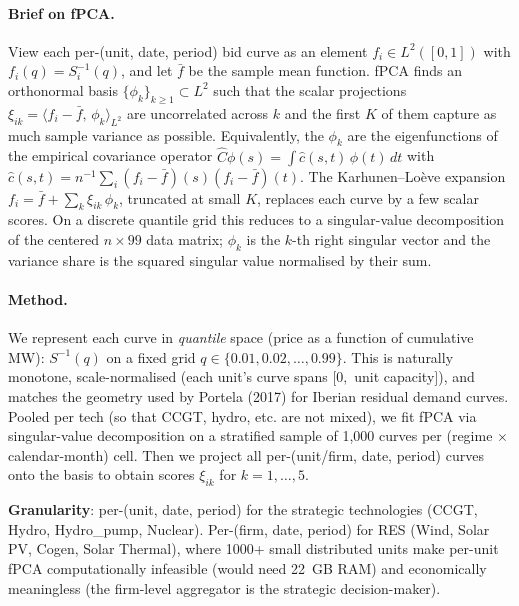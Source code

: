 \documentclass[11pt,a4paper]{article}
\begin{document}
\paragraph{Brief on fPCA.} View each per-(unit, date, period) bid curve as an element $f_i \in L^2([0,1])$ with $f_i(q) = S_i^{-1}(q)$, and let $\bar f$ be the sample mean function. fPCA finds an orthonormal basis $\{\phi_k\}_{k\ge 1} \subset L^2$ such that the scalar projections $\xi_{ik} = \langle f_i - \bar f,\, \phi_k\rangle_{L^2}$ are uncorrelated across $k$ and the first $K$ of them capture as much sample variance as possible. Equivalently, the $\phi_k$ are the eigenfunctions of the empirical covariance operator $\hat C \phi(s) = \int \hat c(s,t)\, \phi(t)\, dt$ with $\hat c(s,t) = n^{-1} \sum_i (f_i - \bar f)(s)(f_i - \bar f)(t)$. The Karhunen–Lo\`eve expansion $f_i = \bar f + \sum_k \xi_{ik}\, \phi_k$, truncated at small $K$, replaces each curve by a few scalar scores. On a discrete quantile grid this reduces to a singular-value decomposition of the centered $n \times 99$ data matrix; $\phi_k$ is the $k$-th right singular vector and the variance share is the squared singular value normalised by their sum.

\paragraph{Method.} We represent each curve in \emph{quantile} space (price as a function of cumulative MW): $S^{-1}(q)$ on a fixed grid $q \in \{0.01, 0.02, \ldots, 0.99\}$. This is naturally monotone, scale-normalised (each unit's curve spans $[0, $ unit capacity$]$), and matches the geometry used by Portela (2017) for Iberian residual demand curves. Pooled per tech (so that CCGT, hydro, etc. are not mixed), we fit fPCA via singular-value decomposition on a stratified sample of 1{,}000 curves per (regime $\times$ calendar-month) cell. Then we project all per-(unit/firm, date, period) curves onto the basis to obtain scores $\xi_{ik}$ for $k = 1, \ldots, 5$.

\textbf{Granularity}: per-(unit, date, period) for the strategic technologies (CCGT, Hydro, Hydro\_pump, Nuclear). Per-(firm, date, period) for RES (Wind, Solar PV, Cogen, Solar Thermal), where 1000+ small distributed units make per-unit fPCA computationally infeasible (would need 22~GB RAM) and economically meaningless (the firm-level aggregator is the strategic decision-maker).
\end{document}
